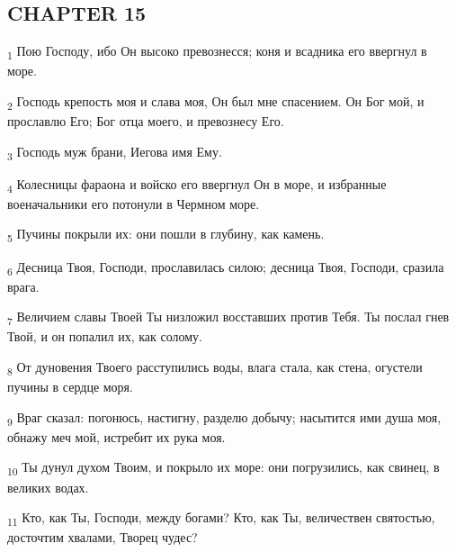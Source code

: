 \subsection{CHAPTER 15}
\begin{tcolorbox}
\textsubscript{1} Пою Господу, ибо Он высоко превознесся; коня и всадника его ввергнул в море.
\end{tcolorbox}
\begin{tcolorbox}
\textsubscript{2} Господь крепость моя и слава моя, Он был мне спасением. Он Бог мой, и прославлю Его; Бог отца моего, и превознесу Его.
\end{tcolorbox}
\begin{tcolorbox}
\textsubscript{3} Господь муж брани, Иегова имя Ему.
\end{tcolorbox}
\begin{tcolorbox}
\textsubscript{4} Колесницы фараона и войско его ввергнул Он в море, и избранные военачальники его потонули в Чермном море.
\end{tcolorbox}
\begin{tcolorbox}
\textsubscript{5} Пучины покрыли их: они пошли в глубину, как камень.
\end{tcolorbox}
\begin{tcolorbox}
\textsubscript{6} Десница Твоя, Господи, прославилась силою; десница Твоя, Господи, сразила врага.
\end{tcolorbox}
\begin{tcolorbox}
\textsubscript{7} Величием славы Твоей Ты низложил восставших против Тебя. Ты послал гнев Твой, и он попалил их, как солому.
\end{tcolorbox}
\begin{tcolorbox}
\textsubscript{8} От дуновения Твоего расступились воды, влага стала, как стена, огустели пучины в сердце моря.
\end{tcolorbox}
\begin{tcolorbox}
\textsubscript{9} Враг сказал: погонюсь, настигну, разделю добычу; насытится ими душа моя, обнажу меч мой, истребит их рука моя.
\end{tcolorbox}
\begin{tcolorbox}
\textsubscript{10} Ты дунул духом Твоим, и покрыло их море: они погрузились, как свинец, в великих водах.
\end{tcolorbox}
\begin{tcolorbox}
\textsubscript{11} Кто, как Ты, Господи, между богами? Кто, как Ты, величествен святостью, досточтим хвалами, Творец чудес?
\end{tcolorbox}
